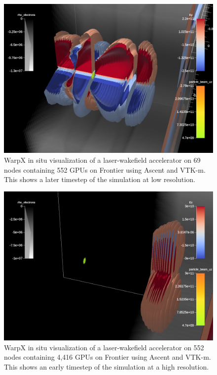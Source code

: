 \begin{figure}
    \centering
    \includegraphics[width=\linewidth]{figures/ey_009300.png}
    \caption{WarpX in situ visualization of a laser-wakefield accelerator on 69 nodes containing 552 GPUs on Frontier using Ascent and VTK-m. This shows a later timestep of the simulation at low resolution.}
    \label{fig:warpx_lowres}
\end{figure}

\begin{figure}
    \centering
    \includegraphics[width=\linewidth]{figures/ez_007050.png}
    \caption{WarpX in situ visualization of a laser-wakefield accelerator on 552 nodes containing 4,416 GPUs on Frontier using Ascent and VTK-m. This shows an early timestep of the simulation at a high resolution.}
    \label{fig:warpx_highres}
\end{figure}


